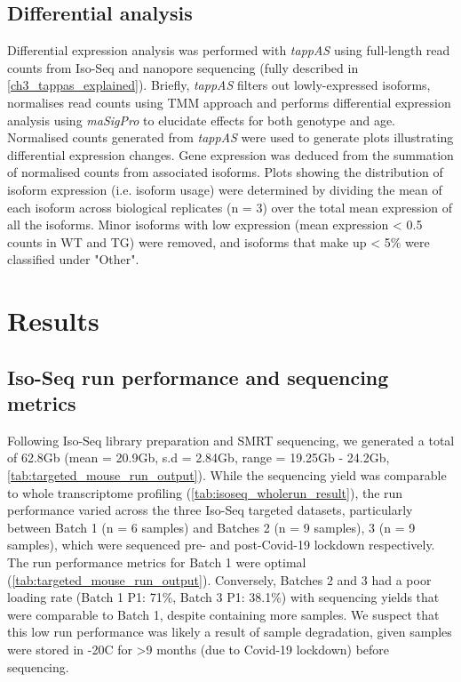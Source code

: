 \newpage
\subsection{Differential analysis}
Differential expression analysis was performed with \textit{tappAS} using full-length read counts from Iso-Seq and nanopore sequencing (fully described in \cref{ch3_tappas_explained}). Briefly, \textit{tappAS} filters out lowly-expressed isoforms, normalises read counts using TMM approach and performs differential expression analysis using \textit{maSigPro}\cite{Conesa2006,Nueda2014,Conesa2017} to elucidate effects for both genotype and age. Normalised counts generated from \textit{tappAS} were used to generate plots illustrating differential expression changes. Gene expression was deduced from the summation of normalised counts from associated isoforms. Plots showing the distribution of isoform expression (i.e. isoform usage) were determined by dividing the mean of each isoform across biological replicates (n = 3) over the total mean expression of all the isoforms. Minor isoforms with low expression (mean expression < 0.5 counts in WT and TG) were removed, and isoforms that make up < 5\% were classified under "Other". 

\newpage
\section{Results}
\subsection{Iso-Seq run performance and sequencing metrics}
Following Iso-Seq library preparation and SMRT sequencing, we generated a total of 62.8Gb (mean = 20.9Gb, s.d = 2.84Gb, range = 19.25Gb - 24.2Gb, \cref{tab:targeted_mouse_run_output}). While the sequencing yield was comparable to whole transcriptome profiling (\cref{tab:isoseq_wholerun_result}), the run performance varied across the three Iso-Seq targeted datasets, particularly between Batch 1 (n = 6 samples) and Batches 2 (n = 9 samples), 3 (n = 9 samples), which were sequenced pre- and post-Covid-19 lockdown respectively. The run performance metrics for Batch 1 were optimal (\cref{tab:targeted_mouse_run_output}). Conversely, Batches 2 and 3 had a poor loading rate (Batch 1 P1:  71\%, Batch 3 P1: 38.1\%) with sequencing yields that were comparable to Batch 1, despite containing more samples. We suspect that this low run performance was likely a result of sample degradation, given samples were stored in -20\textdegree C for >9 months (due to Covid-19 lockdown) before sequencing. 

